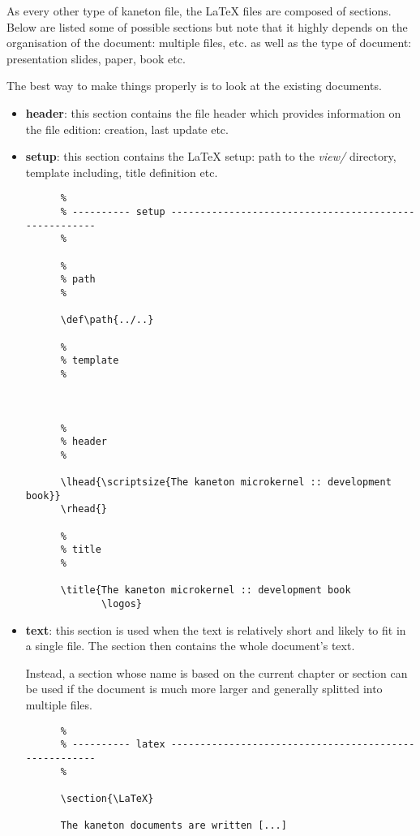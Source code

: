 As every other type of kaneton file, the {\LaTeX} files are composed of
sections. Below are listed some of possible sections but note that it
highly depends on the organisation of the document: multiple files, etc.
as well as the type of document: presentation slides, paper, book etc.

The best way to make things properly is to look at the existing documents.

\begin{itemize}
  \item
    \textbf{header}: this section contains the file header which provides
    information on the file edition: creation, last update etc.
  \item
    \textbf{setup}: this section contains the {\LaTeX} setup: path to the
    \textit{view/} directory, template including, title definition etc.

    \begin{verbatim}
      %
      % ---------- setup ------------------------------------------------------
      %

      %
      % path
      %

      \def\path{../..}

      %
      % template
      %

      

      %
      % header
      %

      \lhead{\scriptsize{The kaneton microkernel :: development book}}
      \rhead{}

      %
      % title
      %

      \title{The kaneton microkernel :: development book
             \logos}
    \end{verbatim}
  \item
    \textbf{text}: this section is used when the text is relatively short
    and likely to fit in a single file. The section then contains the
    whole document's text.

    Instead, a section whose name is based on the current chapter or section
    can be used if the document is much more larger and generally splitted
    into multiple files.

    \begin{verbatim}
      %
      % ---------- latex ------------------------------------------------------
      %

      \section{\LaTeX}

      The kaneton documents are written [...]
    \end{verbatim}
\end{itemize}

